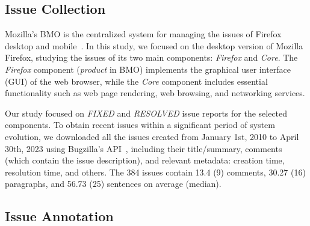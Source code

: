 \subsection{Issue Collection}
\label{sub:issue_collection}



Mozilla's BMO is the centralized system for managing the issues of Firefox desktop and mobile~\cite{mozilla-products}. In this study, we focused on the desktop version of Mozilla Firefox, studying the issues of its two main components: \textit{Firefox} and \textit{Core}.  The \textit{Firefox} component (\aka \textit{product} in BMO) implements the graphical user interface (GUI) of the web browser, while the \textit{Core} component includes essential functionality such as web page rendering, web browsing, and networking services. 


Our study focused on \textit{FIXED} and \textit{RESOLVED} issue reports
for the selected components. To obtain recent issues within a significant period of system evolution, we downloaded all the issues created from January 1st, 2010 to April 30th, 2023 using Bugzilla's API~\cite{bugzilla-api}, including their title/summary, comments (which contain the issue description), and relevant metadata: creation time, resolution time, and others.
The 384 issues contain 13.4 (9) comments, 30.27 (16) paragraphs, and 56.73 (25) sentences on average (median). 













\subsection{Issue Annotation}
\label{sub:issue_annotation}





